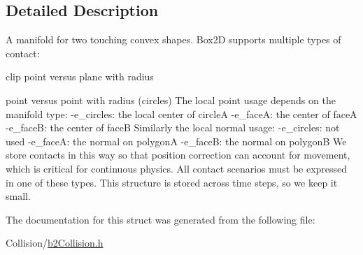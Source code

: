 \subsection{Detailed Description}
A manifold for two touching convex shapes. Box2D supports multiple types of contact\+:
\begin{DoxyItemize}
\item clip point versus plane with radius
\item point versus point with radius (circles) The local point usage depends on the manifold type\+: -\/e\+\_\+circles\+: the local center of circleA -\/e\+\_\+faceA\+: the center of faceA -\/e\+\_\+faceB\+: the center of faceB Similarly the local normal usage\+: -\/e\+\_\+circles\+: not used -\/e\+\_\+faceA\+: the normal on polygonA -\/e\+\_\+faceB\+: the normal on polygonB We store contacts in this way so that position correction can account for movement, which is critical for continuous physics. All contact scenarios must be expressed in one of these types. This structure is stored across time steps, so we keep it small. 
\end{DoxyItemize}

The documentation for this struct was generated from the following file\+:\begin{DoxyCompactItemize}
\item 
Collision/\mbox{\hyperlink{b2Collision_8h}{b2\+Collision.\+h}}\end{DoxyCompactItemize}
